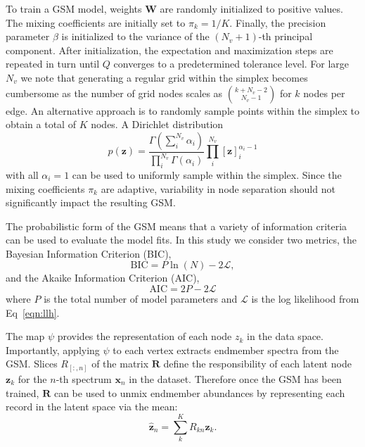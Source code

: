 To train a GSM model, weights $\mathbf{W}$ are randomly initialized to positive
values. The mixing coefficients are initially set to $\pi_k = 1/K$. Finally, the
precision parameter $\beta$ is initialized to the variance of the $(N_v+1)$-th
principal component. After initialization, the expectation and maximization
steps are repeated in turn until $Q$ converges to a predetermined tolerance
level. For large $N_v$ we note that generating a regular grid within the simplex
becomes cumbersome as the number of grid nodes scales as ${k + N_v - 2 \choose
  N_v - 1}$ for $k$ nodes per edge. An alternative approach is to randomly
sample points within the simplex to obtain a total of $K$ nodes. A Dirichlet
distribution
\begin{equation}
    p(\mathbf{z}) = \frac{\Gamma(\sum_i^{N_v}\alpha_i)}{\prod_{i}^{N_v}\Gamma(\alpha_i)} \prod_{i}^{N_v} [\mathbf{z}]_i^{\alpha_i-1}
\end{equation}
with all $\alpha_i=1$ can be used to uniformly sample within the simplex. Since
the mixing coefficients $\pi_k$ are adaptive, variability in node separation
should not significantly impact the resulting GSM.

The probabilistic form of the GSM means that a variety of information criteria
can be used to evaluate the model fits. In this study we consider two metrics,
the Bayesian Information Criterion (BIC),
\begin{equation}
   \text{BIC} = P\ln(N) - 2\mathscr{L},
\end{equation}
and the Akaike Information Criterion (AIC),
\begin{equation}
    \text{AIC} = 2P - 2\mathscr{L}
\end{equation}
where $P$ is the total number of model parameters and $\mathscr{L}$ is the log
likelihood from Eq~\ref{eqn:llh}.

The map $\psi$ provides the representation of each node $z_k$ in the data space.
Importantly, applying $\psi$ to each vertex extracts endmember spectra from the
GSM. Slices $R_{\left[:,n\right]}$ of the matrix $\mathbf{R}$ define the
responsibility of each latent node $\mathbf{z}_k$ for the $n$-th spectrum
$\mathbf{x}_n$ in the dataset. Therefore once the GSM has been trained,
$\mathbf{R}$ can be used to unmix endmember abundances by representing each
record in the latent space via the mean:
\begin{equation}
    \hat{\mathbf{z}}_n = \sum_k^K R_{kn}\mathbf{z}_k.
\end{equation}

